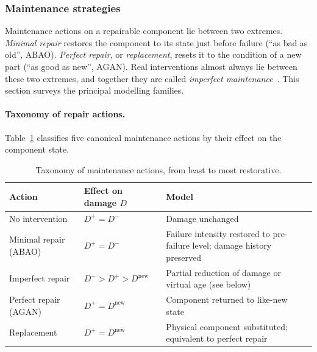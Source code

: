 \documentclass[11pt,a4paper]{article}
\theoremstyle{plain}
\theoremstyle{definition}
\theoremstyle{remark}
\begin{document}
\subsubsection{Maintenance strategies}
\label{sec:maint_strategies}

Maintenance actions on a repairable component lie between two extremes.
\emph{Minimal repair} restores the component to its state just before failure (``as bad as old'', ABAO).
\emph{Perfect repair}, or \emph{replacement}, resets it to the condition of a new part (``as good as new'', AGAN).
Real interventions almost always lie between these two extremes, and together they are called \emph{imperfect maintenance}~\cite{PhamWang1996}.
This section surveys the principal modelling families.

\paragraph{Taxonomy of repair actions.}

Table~\ref{tab:repair_actions} classifies five canonical maintenance actions by their effect on the component state.

\begin{table}[htbp]
\centering
\caption{Taxonomy of maintenance actions, from least to most restorative.}
\label{tab:repair_actions}
\small
\begin{tabularx}{\linewidth}{@{}>{\hsize=0.677\hsize\raggedright\arraybackslash}X>{\hsize=1.015\hsize\raggedright\arraybackslash}X>{\hsize=1.308\hsize\raggedright\arraybackslash}X@{}}
\toprule
\rowcolor{headgrey}
\textbf{Action} & \textbf{Effect on damage $D$} & \textbf{Model} \\
\midrule
No intervention
  & $D^+ = D^-$
  & Damage unchanged \\[3pt]
Minimal repair (ABAO)
  & $D^+ = D^-$
  & Failure intensity restored to pre-failure level; damage history preserved~\cite{BrownProschan1983} \\[3pt]
Imperfect repair
  & $D^- > D^+ > D^{\mathrm{new}}$
  & Partial reduction of damage or virtual age (see below) \\[3pt]
Perfect repair (AGAN)
  & $D^+ = D^{\mathrm{new}}$
  & Component returned to like-new state \\[3pt]
Replacement
  & $D^+ = D^{\mathrm{new}}$
  & Physical component substituted; equivalent to perfect repair \\
\bottomrule
\end{tabularx}
\end{table}
\end{document}
